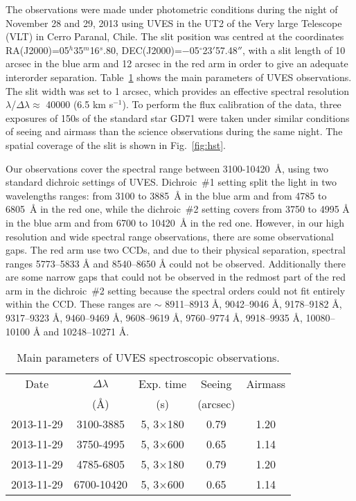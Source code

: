 \documentclass[fleqn,usenatbib]{mnras}
\begin{document}
The observations were made under photometric conditions during the night of November 28 and 29, 2013 using UVES in the UT2 of the Very large Telescope (VLT) in Cerro Paranal, Chile. The slit position was centred at the coordinates RA(J2000)=05$^h$35$^m$16$^s$.80, DEC(J2000)=$-$05$^{\circ}$23$'$57.48$''$, with a slit length of 10 arcsec in the blue arm and 12 arcsec in the red arm in order to give an adequate interorder separation. Table~\ref{tab:observations} shows the main parameters of UVES observations. The slit width was set to 1 arcsec, which provides an effective spectral resolution $\lambda$/$\Delta \lambda \approx$ 40000 (6.5 km s$^{-1}$). To perform the flux calibration of the data, three exposures of 150s of the standard star GD71 \citep{Moehler14a,Moehler14b} were taken under similar conditions of seeing and airmass than the science observations during the same night. The spatial coverage of the slit is shown in Fig.~\ref{fig:hst}.

Our observations cover the spectral range between 3100-10420~\AA, using two standard dichroic settings of UVES.  Dichroic~\#1 setting split the light in two wavelengths ranges: from 3100 to 3885~\AA$\text{}$ in the blue arm and from 4785 to 6805~\AA$\text{}$ in the red one, while the dichroic~\#2 setting covers from 3750 to 4995 \AA$\text{}$ in the blue arm and from 6700 to 10420~\AA$\text{}$ in the red one. However, in our high resolution and wide spectral range observations, there are some observational gaps. The red arm use two CCDs, and due to their physical separation, spectral ranges 5773--5833 \AA$\text{}$ and 8540--8650 \AA$\text{}$ could not be observed. Additionally there are some narrow gaps that could not be observed in the redmost part of the red arm in the dichroic~\#2 setting because the spectral orders could not fit entirely within the CCD. These ranges are $\sim$ 8911--8913 \AA, 9042--9046 \AA, 9178--9182 \AA, 9317--9323 \AA, 9460--9469 \AA, 9608--9619 \AA, 9760--9774 \AA, 9918--9935 \AA, 10080--10100 \AA$\text{}$ and 10248--10271 \AA. 

\begin{table}
\caption{Main parameters of UVES spectroscopic observations.}
\label{tab:observations}
\begin{tabular}{ccccc}
\hline
Date & $\Delta \lambda$& Exp. time  &Seeing &Airmass\\
 & (\AA) &  (s) & (arcsec)&\\
\hline
2013-11-29 & 3100-3885 & 5, 3$\times$180 &0.79&1.20\\
2013-11-29 & 3750-4995 & 5, 3$\times$600 &0.65&1.14\\
2013-11-29 & 4785-6805 & 5, 3$\times$180 &0.79&1.20\\
2013-11-29 & 6700-10420 & 5, 3$\times$600 &0.65&1.14\\
\hline
\end{tabular}
\end{table}
\end{document}
